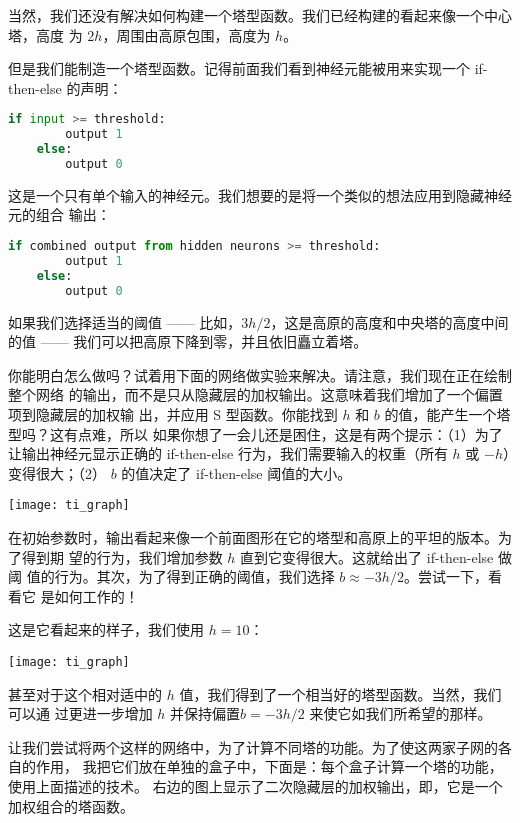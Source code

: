 当然，我们还没有解决如何构建一个塔型函数。我们已经构建的看起来像一个中心塔，高度
为 $2h$，周围由高原包围，高度为 $h$。

但是我们能制造一个塔型函数。记得前面我们看到神经元能被用来实现一个 {\serif
  if-then-else} 的声明：
\begin{lstlisting}[language=Python]
    if input >= threshold: 
        output 1
    else:
        output 0
\end{lstlisting}

这是一个只有单个输入的神经元。我们想要的是将一个类似的想法应用到隐藏神经元的组合
输出：
\begin{lstlisting}[language=Python]
    if combined output from hidden neurons >= threshold:
        output 1
    else:
        output 0
\end{lstlisting}

如果我们选择适当的阈值 —— 比如，$3h/2$，这是高原的高度和中央塔的高度中间的值 ——
我们可以把高原下降到零，并且依旧矗立着塔。

你能明白怎么做吗？试着用下面的网络做实验来解决。请注意，我们现在正在绘制整个网络
的输出，而不是只从隐藏层的加权输出。这意味着我们增加了一个偏置项到隐藏层的加权输
出，并应用 S 型函数。你能找到 $h$ 和 $b$ 的值，能产生一个塔型吗？这有点难，所以
如果你想了一会儿还是困住，这是有两个提示：（1）为了让输出神经元显示正确的
{\serif if-then-else} 行为，我们需要输入的权重（所有 $h$ 或 $-h$）变得很大；（2）
$b$ 的值决定了 {\serif if-then-else} 阈值的大小。
\begin{center}
  \texttt{[image: ti\_graph]}
\end{center}

在初始参数时，输出看起来像一个前面图形在它的塔型和高原上的平坦的版本。为了得到期
望的行为，我们增加参数 $h$ 直到它变得很大。这就给出了 {\serif if-then-else} 做阈
值的行为。其次，为了得到正确的阈值，我们选择 $b \approx -3h/2$。尝试一下，看看它
是如何工作的！

这是它看起来的样子，我们使用 $h = 10$：
\begin{center}
  \texttt{[image: ti\_graph]}
\end{center}

甚至对于这个相对适中的 $h$ 值，我们得到了一个相当好的塔型函数。当然，我们可以通
过更进一步增加 $h$ 并保持偏置$b = -3h/2$ 来使它如我们所希望的那样。

让我们尝试将两个这样的网络中，为了计算不同塔的功能。为了使这两家子网的各自的作用，
我把它们放在单独的盒子中，下面是：每个盒子计算一个塔的功能，使用上面描述的技术。
右边的图上显示了二次隐藏层的加权输出，即，它是一个加权组合的塔函数。

